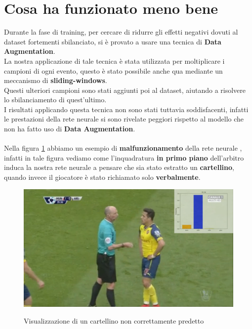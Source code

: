 \section{Cosa ha funzionato meno bene}
Durante la fase di training, per cercare di ridurre gli effetti negativi dovuti al dataset fortementi sbilanciato, si è provato a usare una tecnica di \textbf{Data Augmentation}.
\\La nostra applicazione di tale tecnica è stata utilizzata per moltiplicare i campioni di ogni evento, questo è stato possibile anche qua mediante un meccanismo di \textbf{sliding-windows}.
\\Questi ulteriori campioni sono stati aggiunti poi al dataset, aiutando a risolvere lo sbilanciamento di quest'ultimo.
\\I risultati applicando questa tecnica non sono stati tuttavia soddisfacenti, infatti le prestazioni della rete neurale si sono rivelate peggiori rispetto al modello che non ha fatto uso di \textbf{Data Augmentation}.\\
\\Nella figura \ref{figure : fakecard} abbiamo un esempio di \textbf{malfunzionamento} della rete neurale , infatti in tale figura vediamo come l'inquadratura \textbf{in primo piano} dell'arbitro induca la nostra rete neurale a pensare che sia stato estratto un \textbf{cartellino}, quando invece il giocatore è stato richiamato solo \textbf{verbalmente}.
\begin{figure}[ht]
\centering
\caption{Visualizzazione di un cartellino non correttamente predetto}
\includegraphics[width=\linewidth]{img/fakecard.png}
\label{figure : fakecard}
\end{figure}
